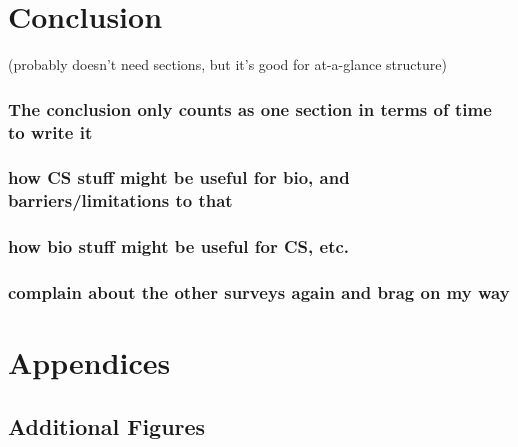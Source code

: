 \documentclass[12pt]{thesis}
\theoremstyle{plain}
\theoremstyle{definition}
\theoremstyle{remark}
\begin{document}
{%








\chapter{Conclusion}\label{chapter:conclusion}

 (probably doesn't need sections, but it's good for at-a-glance structure)

\subsection{The conclusion only counts as one section in terms of time to write it}

\subsection{how CS stuff might be useful for bio, and barriers/limitations to that}

\subsection{how bio stuff might be useful for CS, etc.}

\subsection{complain about the other surveys again and brag on my way}
 















\appendix

\chapter{Appendices}\label{chapter:appendices}

\section{Additional Figures}

}
\end{document}
